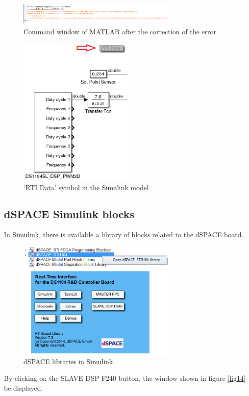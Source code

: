 \begin{enumerate}
    \begin{figure}[H]
        \centering
        \includegraphics[width=0.7\textwidth]{Images/Ball and Bean/MatLab11.png}
        \caption{Command window of MATLAB after the correction of the error}
        \label{fig12}
    \end{figure}
    
    \begin{figure}[H]
        \centering
        \includegraphics[width=0.5\textwidth]{Images/Ball and Bean/MatLab12.png}
        \caption{‘RTI Data’ symbol in the Simulink model}
        \label{fig13}
    \end{figure}
\end{enumerate}

\subsection{dSPACE Simulink blocks}

In Simulink, there is available a library of blocks related to the dSPACE board.
    
    \begin{figure}[H]
        \centering
        \includegraphics[width=0.7\textwidth]{Images/Ball and Bean/MatLab4.png}
        \caption{dSPACE libraries in Simulink.}
        \label{fig5}
    \end{figure}
By clicking on the SLAVE DSP F240 button, the window shown in figure \ref{fig14} be displayed.

